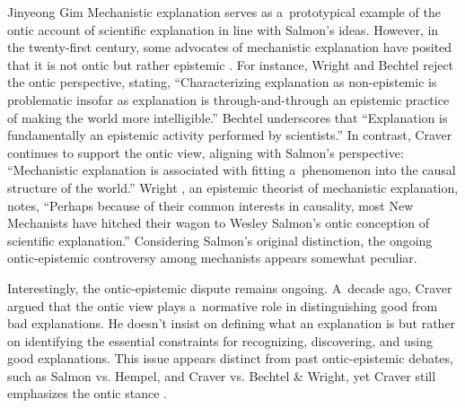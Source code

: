 \begin{artengenv}{Jinyeong Gim}
Mechanistic explanation serves as a~prototypical example of the ontic account of scientific explanation in line with Salmon's ideas. However, in the twenty-first century, some advocates of mechanistic explanation have posited that it is not ontic but rather epistemic
\parencites[][]{bechtel_explanation_2005}[][]{wright_mechanisms_2007}[][]{wright_mechanistic_2012}[][]{wright_ontic_2015}. %
 For instance, Wright and Bechtel 
\parencite*[][p.51]{wright_mechanisms_2007} %
 reject the ontic perspective, stating, ``Characterizing explanation as non-epistemic is problematic insofar as explanation is through-and-through an epistemic practice of making the world more intelligible.'' Bechtel 
\parencite*[][p.18]{bechtel_mental_2008} %
 underscores that ``Explanation is fundamentally an epistemic activity performed by scientists.'' In contrast, Craver 
\parencite*[][p.21]{craver_explaining_2007} %
 continues to support the ontic view, aligning with Salmon's perspective: ``Mechanistic explanation is associated with fitting a~phenomenon into the causal structure of the world.'' Wright 
\parencite*[][p.376]{wright_mechanistic_2012}, %
 an epistemic theorist of mechanistic explanation, notes, ``Perhaps because of their common interests in causality, most New Mechanists have hitched their wagon to Wesley Salmon's ontic conception of scientific explanation.'' Considering Salmon's original distinction, the ongoing ontic-epistemic controversy among mechanists appears somewhat peculiar.

Interestingly, the ontic-epistemic dispute remains ongoing. A~decade ago, Craver
\parencite*[][p.28]{kaiser_ontic_2014} %
 argued that the ontic view plays a~normative role in distinguishing good from bad explanations. He doesn't insist on defining what an explanation is but rather on identifying the essential constraints for recognizing, discovering, and using good explanations. This issue appears distinct from past ontic-epistemic debates, such as Salmon vs. Hempel, and Craver vs. Bechtel \& Wright, yet Craver still emphasizes the ontic stance 
\parencites[see][]{kaplan_explanatory_2011}[][]{craver_search_2013}[][]{kaiser_ontic_2014}.%



\end{artengenv}
